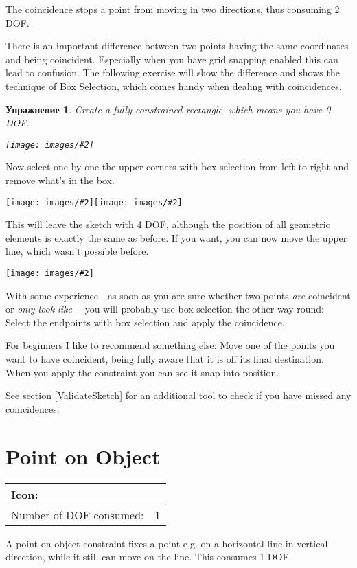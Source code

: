 \documentclass[12pt,titlepage]{article}
\newcommand{\icon}[1]{\raisebox{-1em}{\rule{0pt}{27pt}\texttt{[image: images/\#1]}}}
\newcommand{\img}[2]{\vspace{2ex}\noindent\texttt{[image: images/\#2]}}
\newcommand{\dofConsumed}{Number of DOF consumed:}
\newtheorem{Exercise}{Упражнение}
\begin{document}
The coincidence stops a point from moving in two directions, thus consuming 2 DOF.

There is an important difference between two points having the same
coordinates and being coincident. Especially when you have grid snapping
enabled this can lead to confusion. The following exercise will show the difference
and shows the technique of Box Selection, which comes handy when dealing with
coincidences.

\begin{Exercise}
\label{ExampleBoxSelection}
Create a fully constrained rectangle, which means you have 0 DOF.

\img{}{Coincidence1}
\end{Exercise}
Now select one by one the upper corners with box selection from left to right and
remove what's in the box.

\img{scale=0.9}{Coincidence2}\hspace{2em}\img{scale=0.9}{Coincidence3}

This will leave the sketch with 4 DOF, although the position of all geometric
elements is exactly the same as before. If you want, you can now move the upper line,
which wasn't possible before.

\img{scale=0.7}{Coincidence4}

With some experience---as soon as you are sure whether two points \emph{are} coincident
or \emph{only look like}--- you will probably use box selection the other way
round: Select the endpoints with box selection and apply the coincidence.

For beginners I like to recommend something else: Move one of the points you want to
have coincident, being fully aware that it is off its final destination. When you
apply the constraint you can see it snap into position.

See section \vref{ValidateSketch} for an additional tool to check if you have missed any
coincidences.


\section{Point on Object}
\label{PointOnObject}
\begin{tabular}{|l|l|}
\hline
Icon: & \icon{Constraint_PointOnObject}\\
\hline
\dofConsumed & 1 \\
\hline
\end{tabular}

A point-on-object constraint fixes a point e.g. on a horizontal line in vertical direction, while it still
can move on the line. This consumes 1 DOF.
\end{document}

